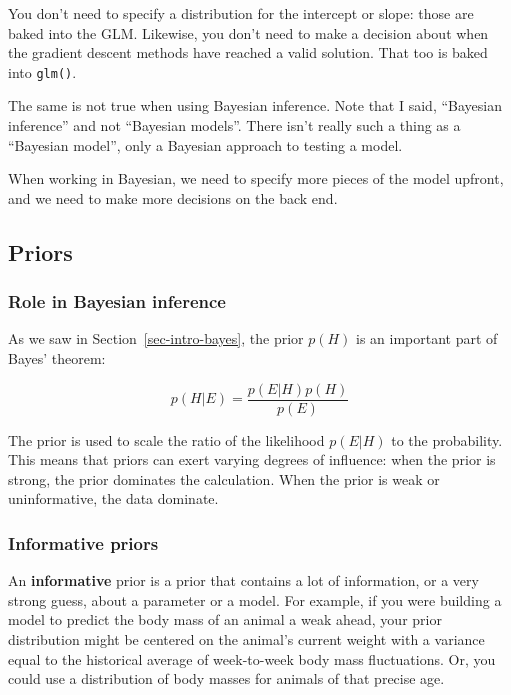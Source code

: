 \documentclass[
  13,
  letterpaper,
]{report}
\begin{document}
You don't need to specify a distribution for the intercept or slope:
those are baked into the GLM. Likewise, you don't need to make a
decision about when the gradient descent methods have reached a valid
solution. That too is baked into \texttt{glm()}.

The same is not true when using Bayesian inference. Note that I said,
``Bayesian inference'' and not ``Bayesian models''. There isn't really
such a thing as a ``Bayesian model'', only a Bayesian approach to
testing a model.

When working in Bayesian, we need to specify more pieces of the model
upfront, and we need to make more decisions on the back end.

\subsection{Priors}\label{priors}

\subsubsection{Role in Bayesian
inference}\label{role-in-bayesian-inference}

As we saw in Section~\ref{sec-intro-bayes}, the prior
\(p\left(H\right)\) is an important part of Bayes' theorem:

\[p\left(H|E\right)=\frac{p\left(E|H\right)p\left(H\right)}{p\left(E\right)}\]

The prior is used to scale the ratio of the likelihood
\(p\left(E|H\right)\) to the probability. This means that priors can
exert varying degrees of influence: when the prior is strong, the prior
dominates the calculation. When the prior is weak or uninformative, the
data dominate.

\subsubsection{Informative priors}\label{informative-priors}

An \textbf{informative} prior is a prior that contains a lot of
information, or a very strong guess, about a parameter or a model. For
example, if you were building a model to predict the body mass of an
animal a weak ahead, your prior distribution might be centered on the
animal's current weight with a variance equal to the historical average
of week-to-week body mass fluctuations. Or, you could use a distribution
of body masses for animals of that precise age.
\end{document}
